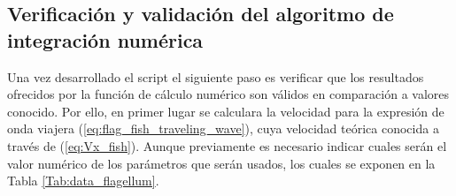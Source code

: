 \subsection{Verificación y validación del algoritmo de integración numérica} \label{sec:verificacion_script}

Una vez desarrollado el script el siguiente paso es verificar que los resultados ofrecidos por la función de cálculo numérico son válidos en comparación a valores conocido. Por ello, en primer lugar se calculara la velocidad para la expresión de onda viajera (\ref{eq:flag_fish_traveling_wave}), cuya velocidad teórica conocida a través de (\ref{eq:Vx_fish}). Aunque previamente es necesario indicar cuales serán el valor numérico de los parámetros que serán usados, los cuales se exponen en la Tabla \ref{Tab:data_flagellum}.\\
\begin{table}[!h]
\centering
\caption{Valor de los parámetros, extraídos de \cite{Gray1955}}
\end{table}

